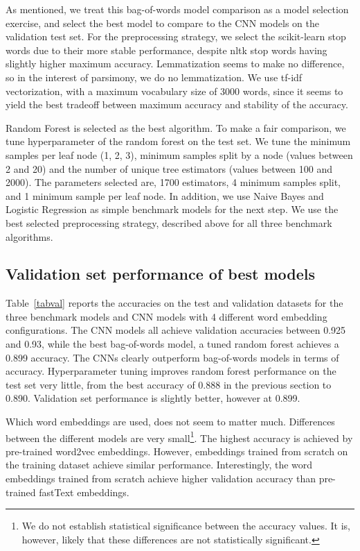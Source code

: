 \documentclass[conference]{IEEEtran}
\begin{document}
As mentioned, we treat this  bag-of-words model comparison as a model selection exercise, and select the best model to compare to the CNN models on the validation test set. For the preprocessing strategy, we select the scikit-learn stop words due to their more stable performance, despite nltk stop words having slightly higher maximum accuracy. Lemmatization seems to make no difference, so in the interest of parsimony, we do no lemmatization. We use tf-idf vectorization, with a maximum vocabulary size of 3000 words, since it seems to yield the best tradeoff between maximum accuracy and stability of the accuracy.

Random Forest is selected as the best algorithm. To make a fair comparison, we tune hyperparameter of the random forest on the test set. We tune the minimum samples per leaf node (1, 2, 3), minimum samples split by a node (values between 2 and 20) and the number of unique tree estimators (values between 100 and 2000). The parameters selected are, 1700 estimators, 4 minimum samples split, and 1 minimum sample per leaf node. In addition, we use Naive Bayes and Logistic Regression as simple benchmark models for the next step. We use the best selected preprocessing strategy, described above for all three benchmark algorithms.

\subsection{Validation set performance of best models}

Table~\ref{tabval} reports the accuracies on the test and validation datasets for the three benchmark models and CNN models with 4 different word embedding configurations. The CNN models all achieve validation accuracies between 0.925 and 0.93, while the best bag-of-words model, a tuned random forest achieves a 0.899 accuracy. The CNNs clearly outperform bag-of-words models in terms of accuracy. Hyperparameter tuning improves random forest performance on the test set very little, from the best accuracy of 0.888 in the previous section to 0.890. Validation set performance is slightly better, however at 0.899.

Which word embeddings are used, does not seem to matter much. Differences between the different models are very small\footnote{We do not establish statistical significance between the accuracy values. It is, however, likely that these differences are not statistically significant.}. The highest accuracy is achieved by pre-trained word2vec embeddings. However, embeddings trained from scratch on the training dataset achieve similar performance. Interestingly, the word embeddings trained from scratch achieve higher validation accuracy than pre-trained fastText embeddings. 
\end{document}
